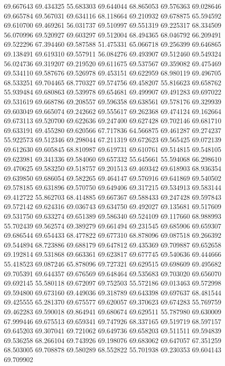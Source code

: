 69.667643
69.434325
55.683303
69.644044
68.865053
69.576363
69.028646
69.665784
69.567031
69.634116
68.118664
69.210932
69.678875
65.594592
69.610700
69.469261
56.031737
69.510997
69.551319
69.225317
68.334509
56.070996
69.520927
69.603297
69.512004
68.494365
68.046792
66.209491
69.522296
67.394460
69.587588
51.475331
65.066718
69.256399
69.646865
69.138491
69.619310
69.557911
56.084276
69.493907
69.512460
69.549324
56.024736
69.319207
69.219520
69.611675
69.537567
69.359082
69.475469
69.534110
69.587676
69.526978
69.453151
69.622959
68.980119
69.496705
68.533251
69.704465
68.770327
69.574756
69.458207
55.816623
69.658762
55.939484
69.680863
69.539978
69.654681
69.499907
69.491283
69.697022
69.531619
69.668786
69.208557
69.596358
69.638561
69.578176
69.329939
69.603049
69.665074
69.242662
69.555617
69.262368
69.474124
69.162664
69.673113
69.520700
69.622636
69.247400
69.627428
69.702146
69.681710
69.633191
69.455280
69.620566
67.717836
64.566875
69.461287
69.274237
55.922573
69.512346
69.298044
67.211319
69.672623
69.565425
69.072139
69.612630
69.605845
68.810987
69.619731
69.610761
69.514815
69.548105
69.623981
69.341336
69.584060
69.657332
55.645661
55.594068
66.298610
69.470625
69.583250
69.518757
69.201513
69.469342
69.618903
68.936354
69.639850
69.686054
69.582265
69.464147
69.576916
69.641869
69.540502
69.578185
69.631896
69.570750
69.649406
69.317215
69.534913
69.583144
69.412722
55.862703
68.414885
69.667367
69.588433
69.247428
69.597843
69.572142
69.624316
69.036743
69.634750
69.492027
69.135681
69.517609
69.531750
69.633274
69.651389
69.586340
69.524109
69.117660
68.988993
55.702439
69.562574
69.389279
69.661494
69.231545
69.685906
69.659307
69.686544
69.654433
68.477822
69.677310
68.878096
69.087518
69.266392
69.544894
68.723886
69.688179
69.647812
69.435369
69.709887
69.652658
69.192814
69.531868
69.663361
69.623817
69.677745
69.540636
69.444666
55.418523
69.087246
65.878096
69.727321
69.629515
69.698609
69.495682
69.705391
69.644357
69.676569
69.648464
69.535683
69.703020
69.656070
69.692145
55.580118
69.672097
69.752503
55.572186
69.013463
69.572998
69.594800
69.673160
69.449036
69.318789
69.643398
69.697637
68.481544
69.425555
65.281370
69.675577
69.620057
69.370623
69.674283
55.769759
69.462283
69.590018
69.864941
69.680674
69.629511
55.787980
69.630009
67.999446
69.675513
69.659341
69.747926
68.337165
69.519719
68.597157
69.645203
69.307041
69.721062
69.649736
69.658203
69.511511
69.594839
69.536258
68.266104
69.743926
69.198076
69.683062
69.647057
67.351259
68.503005
69.708878
69.580289
68.552822
55.701938
69.230353
69.604143
69.709902
